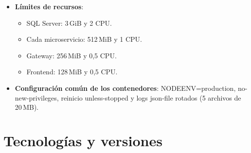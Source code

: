 \documentclass[11pt,a4paper,oneside]{report}
\newcommand{\codus}{\textunderscore\allowbreak}
\DeclareRobustCommand{\cod}[1]{{\small\ttfamily\let\_\codus #1}}
\begin{document}
\begin{itemize}
  \item \textbf{Límites de recursos}:
    \begin{itemize}
      \item SQL Server: 3\,GiB y 2 CPU.
      \item Cada microservicio: 512\,MiB y 1 CPU.
      \item Gateway: 256\,MiB y 0,5 CPU.
      \item Frontend: 128\,MiB y 0,5 CPU.
    \end{itemize}
  \item \textbf{Configuración común de los contenedores}: \cod{NODE\_ENV=production}, \cod{no-new-privileges},
        reinicio \cod{unless-stopped} y logs \cod{json-file} rotados (5 archivos de 20\,MB).
\end{itemize}

\chapter{Tecnologías y versiones}
\end{document}

